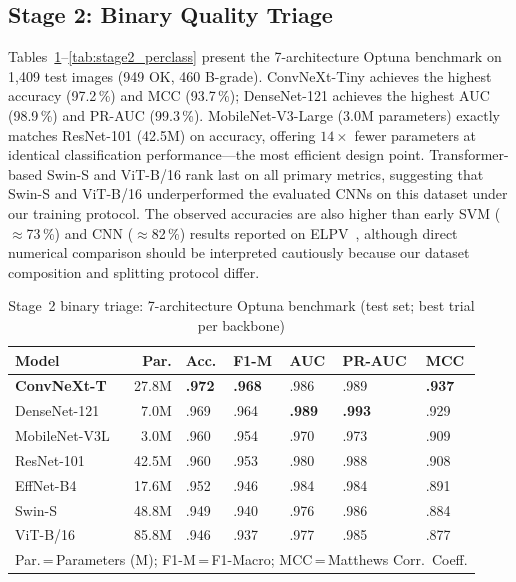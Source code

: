 \documentclass[conference]{IEEEtran}
\begin{document}
\subsection{Stage 2: Binary Quality Triage}

Tables~\ref{tab:stage2_results}--\ref{tab:stage2_perclass} present the 7-architecture Optuna benchmark on 1{,}409 test images (949 OK, 460 B-grade). ConvNeXt-Tiny achieves the highest accuracy (97.2\,\%) and MCC (93.7\,\%); DenseNet-121 achieves the highest AUC (98.9\,\%) and PR-AUC (99.3\,\%). MobileNet-V3-Large (3.0M parameters) exactly matches ResNet-101 (42.5M) on accuracy, offering $14\times$ fewer parameters at identical classification performance---the most efficient design point. Transformer-based Swin-S and ViT-B/16 rank last on all primary metrics, suggesting that Swin-S and ViT-B/16 underperformed the evaluated CNNs on this dataset under our training protocol. The observed accuracies are also higher than early SVM ($\approx$73\,\%) and CNN ($\approx$82\,\%) results reported on ELPV~\cite{deitsch2019}, although direct numerical comparison should be interpreted cautiously because our dataset composition and splitting protocol differ.

\begin{table}[t]
  \caption{Stage~2 binary triage: 7-architecture Optuna benchmark (test set; best trial per backbone)}
  \label{tab:stage2_results}
  \begin{center}
  \renewcommand{\arraystretch}{1.05}\small
  \setlength{\tabcolsep}{3.0pt}
  \begin{tabular}{p{1.75cm}rp{0.6cm}p{0.65cm}p{0.65cm}p{0.72cm}p{0.65cm}}
    \toprule
    \textbf{Model} & \textbf{Par.} & \textbf{Acc.} & \textbf{F1-M} & \textbf{AUC} & \textbf{PR-AUC} & \textbf{MCC}\\
    \midrule
    \textbf{ConvNeXt-T} & 27.8M & \textbf{.972} & \textbf{.968} & .986 & .989 & \textbf{.937}\\
    DenseNet-121        &  7.0M & .969           & .964          & \textbf{.989} & \textbf{.993} & .929\\
    MobileNet-V3L       &  3.0M & .960           & .954          & .970 & .973 & .909\\
    ResNet-101          & 42.5M & .960           & .953          & .980 & .988 & .908\\
    EffNet-B4           & 17.6M & .952           & .946          & .984 & .984 & .891\\
    Swin-S              & 48.8M & .949           & .940          & .976 & .986 & .884\\
    ViT-B/16            & 85.8M & .946           & .937          & .977 & .985 & .877\\
    \bottomrule
    \multicolumn{7}{l}{\footnotesize Par.\,=\,Parameters (M); F1-M\,=\,F1-Macro; MCC\,=\,Matthews Corr.\ Coeff.}
  \end{tabular}
  \end{center}
\end{table}
\end{document}
